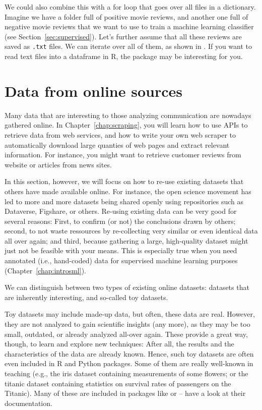 We could also combine this with a for loop that goes over all files in a dictionary.
Imagine we have a folder full of positive movie reviews, and another one full of negative movie reviews that we want to use to train a machine learning classifier (see Section~\ref{sec:supervised}).
Let's further assume that all these reviews are saved as \texttt{.txt} files.
We can iterate over all of them, as shown in . If you want to read text files into a dataframe in R, the  package may be interesting for you.


\section{Data from online sources}
\label{sec:gathering}

Many data that are interesting to those analyzing communication are
nowadays gathered online.  In Chapter~\ref{chap:scraping}, you will
learn how to use APIs to retrieve data from web services, and how to
write your own web scraper to automatically download large quanties of
web pages and extract relevant information. For instance, you might
want to retrieve customer reviews from website or articles from news
sites.

In this section, however, we will focus on how to re-use existing
datasets that others have made available online. For instance, the
open science movement has led to more and more datasets being shared
openly using repositories such as Dataverse, Figshare, or
others. Re-using existing data can be very good for several reasons:
First, to confirm (or not) the conclusions drawn by others; second, to
not waste ressources by re-collecting very similar or even identical
data all over again; and third, because gathering a large,
high-quality dataset might just not be feasible with your means. This
is especially true when you need annotated (i.e., hand-coded) data for
supervised machine learning purposes (Chapter~\ref{chap:introsml}).

We can distinguish between two types of existing online datasets:
datasets that are inherently interesting, and so-called toy datasets.

Toy datasets may include made-up data, but often, these data are
real. However, they are not analyzed to gain scientific insights (any
more), as they may be too small, outdated, or already analyzed
all-over again. These provide a great way, though, to learn and
explore new techniques: After all, the results and the characteristics
of the data are already known. Hence, such toy datasets are often
even included in R and Python packages. Some of them are really
well-known in teaching (e.g., the iris dataset containing measurements
of some flowers; or the titanic dataset containing statistics on
survival rates of passengers on the Titanic). Many of these are included
in packages like  or  -- have a look at their documentation.

